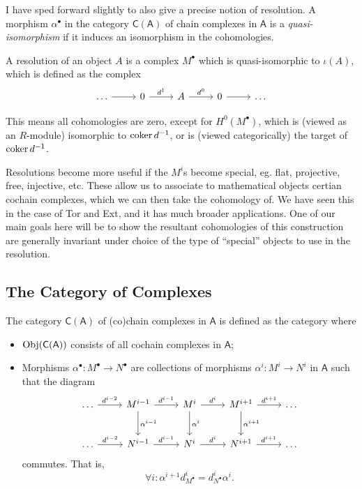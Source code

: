 I have sped forward slightly to also give a precise notion of resolution. A morphism $\alpha ^\bullet $ in the category $\mathsf{C} (\mathsf{A} )$ of chain complexes in $\mathsf{A} $ is a \emph{quasi-isomorphism} if it induces an isomorphism in the cohomologies.
\begin{definition}[Resolution]\label{dfn:9.3.2}
	A resolution of an object $A$ is a complex $M^{\bullet } $ which is quasi-isomorphic to $\iota (A)$, which is defined as the complex
\[\begin{tikzcd}[row sep = 2.5em, column sep = 2.5em]
	\ldots \arrow[r]&0\arrow[r, "d^1"]&A\arrow[r, "d^0"]&0\arrow[r]&\ldots 
\end{tikzcd}\]
\end{definition}
This means all cohomologies are zero, except for $H^0(M^\bullet )$, which is (viewed as an $R$-module) isomorphic to $\operatorname{coker} d^{-1} $, or is (viewed categorically) the target of $\operatorname{coker} d^{-1} $.

Resolutions become more useful if the $M^i$s become special, eg. flat, projective, free, injective, etc. These allow us to associate to mathematical objects certian cochain complexes, which we can then take the cohomology of. We have seen this in the case of Tor and Ext, and it has much broader applications. One of our main goals here will be to show the resultant cohomologies of this construction are generally invariant under choice of the type of ``special'' objects to use in the resolution.

\subsection{The Category of Complexes}
\begin{definition}\label{dfn:9.3.2}
	The category $\mathsf{C} (\mathsf{A} )$ of (co)chain complexes in $\mathsf{A} $ is defined as the category where
	\begin{itemize}
		\item $\operatorname{Obj}(\mathsf{C} (\mathsf{A} )) $ consists of all cochain complexes in $\mathsf{A} $;
		\item Morphisms $\alpha ^\bullet : M^\bullet  \to N^\bullet $ are collections of morphisms $\alpha ^i : M^i \to N^i$ in $\mathsf{A} $ such that the diagram
			\[\begin{tikzcd}[row sep = 2.5em, column sep = 2.5em]
				\ldots\arrow[r, "d^{i-2} "] &M^{i-1} \arrow[d, "\alpha ^{i-1} "]\arrow[r, "d^{i-1} "]&M^i\arrow[d, "\alpha ^i"]\arrow[r, "d^i"]&M^{i+1} \arrow[d, "\alpha ^{i+1} "]\arrow[r, "d^{i+1} "]&\ldots \\
				\ldots \arrow[r, "d^{i-2} "]&N^{i-1} \arrow[r, "d^{i-1} "]&N^i\arrow[r, "d^i"]&N^{i+1} \arrow[r, "d^{i+1} "]&\ldots 
			\end{tikzcd}\]
			commutes. That is,
			\[
				\forall i:\alpha ^{i+1} d_{M^\bullet }^i=d_{N^\bullet }^{i} \alpha ^i
			.\]
	\end{itemize}
\end{definition}

